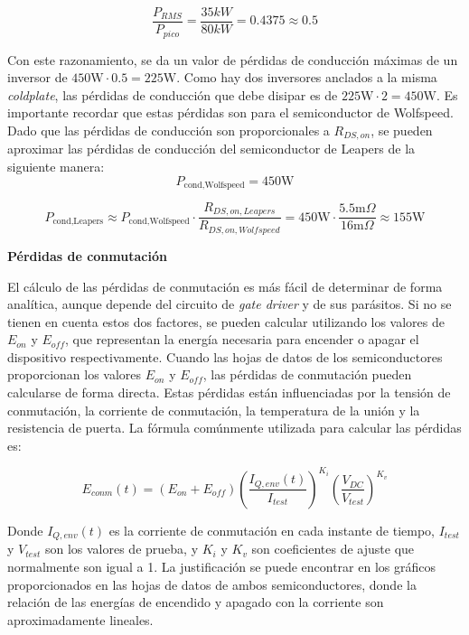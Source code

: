 \[
\frac{P_{RMS}}{P_{pico}} = \frac{35 kW}{80 kW} = 0.4375 \approx 0.5
\]

Con este razonamiento, se da un valor de pérdidas de conducción máximas de un inversor de $450 \text{W} \cdot 0.5 = 225 \text{W}$. Como hay dos inversores anclados a la misma \textit{coldplate}, las pérdidas de conducción que debe disipar es de $225 \text{W} \cdot 2 = 450 \text{W}$. Es importante recordar que estas pérdidas son para el semiconductor de Wolfspeed. Dado que las pérdidas de conducción son proporcionales a $R_{DS, on}$, se pueden aproximar las pérdidas de conducción del semiconductor de Leapers de la siguiente manera:
\[
P_{\text{cond,Wolfspeed}} = 450 \text{W}
\]

\[
P_{\text{cond,Leapers}} \approx P_{\text{cond,Wolfspeed}} \cdot \frac{R_{DS, on, Leapers}}{R_{DS, on, Wolfspeed}} = 450 \text{W} \cdot \frac{5.5 \text{m}\Omega}{16 \text{m}\Omega} \approx 155 \text{W}
\]


\textbf{Pérdidas de conmutación}

El cálculo de las pérdidas de conmutación es más fácil de determinar de forma analítica, aunque depende del circuito de \textit{gate driver} y de sus parásitos. Si no se tienen en cuenta estos dos factores, se pueden calcular utilizando los valores de \(E_{on}\) y \(E_{off}\), que representan la energía necesaria para encender o apagar el dispositivo respectivamente. Cuando las hojas de datos de los semiconductores proporcionan los valores \(E_{on}\) y \(E_{off}\), las pérdidas de conmutación pueden calcularse de forma directa. Estas pérdidas están influenciadas por la tensión de conmutación, la corriente de conmutación, la temperatura de la unión y la resistencia de puerta. La fórmula comúnmente utilizada para calcular las pérdidas es:

\[
E_{conm}(t) = (E_{on} + E_{off}) \left( \frac{I_{Q,env}(t)}{I_{test}} \right)^{K_i} \left( \frac{V_{DC}}{V_{test}} \right)^{K_v}
\]

Donde \(I_{Q,env}(t)\) es la corriente de conmutación en cada instante de tiempo, \(I_{test}\) y \(V_{test}\) son los valores de prueba, y \(K_i\) y \(K_v\) son coeficientes de ajuste que normalmente son igual a 1. La justificación se puede encontrar en los gráficos proporcionados en las hojas de datos de ambos semiconductores, donde la relación de las energías de encendido y apagado con la corriente son aproximadamente lineales.

